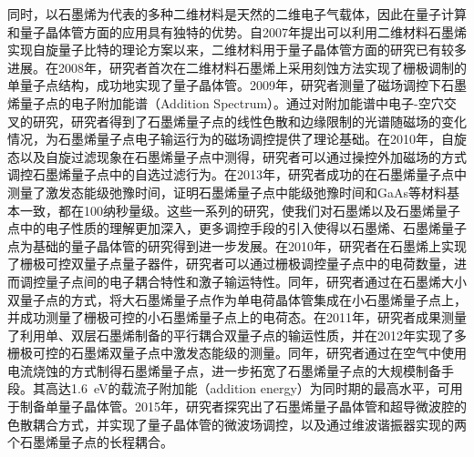     同时，以石墨烯为代表的多种二维材料是天然的二维电子气载体，因此在量子计算和量子晶体管方面的应用具有独特的优势。自2007年提出可以利用二维材料石墨烯实现自旋量子比特的理论方案以来，二维材料用于量子晶体管方面的研究已有较多进展。在2008年，研究者首次在二维材料石墨烯上采用刻蚀方法实现了栅极调制的单量子点结构，成功地实现了量子晶体管。2009年，研究者测量了磁场调控下石墨烯量子点的电子附加能谱（Addition Spectrum）。通过对附加能谱中电子-空穴交叉的研究，研究者得到了石墨烯量子点的线性色散和边缘限制的光谱随磁场的变化情况，为石墨烯量子点电子输运行为的磁场调控提供了理论基础。在2010年，自旋态以及自旋过滤现象在石墨烯量子点中测得，研究者可以通过操控外加磁场的方式调控石墨烯量子点中的自选过滤行为。在2013年，研究者成功的在石墨烯量子点中测量了激发态能级弛豫时间，证明石墨烯量子点中能级弛豫时间和GaAs等材料基本一致，都在100纳秒量级。这些一系列的研究，使我们对石墨烯以及石墨烯量子点中的电子性质的理解更加深入，更多调控手段的引入使得以石墨烯、石墨烯量子点为基础的量子晶体管的研究得到进一步发展。在2010年，研究者在石墨烯上实现了栅极可控双量子点量子器件，研究者可以通过栅极调控量子点中的电荷数量，进而调控量子点间的电子耦合特性和激子输运特性。同年，研究者通过在石墨烯大小双量子点的方式，将大石墨烯量子点作为单电荷晶体管集成在小石墨烯量子点上，并成功测量了栅极可控的小石墨烯量子点上的电荷态。在2011年，研究者成果测量了利用单、双层石墨烯制备的平行耦合双量子点的输运性质，并在2012年实现了多栅极可控的石墨烯双量子点中激发态能级的测量。同年，研究者通过在空气中使用电流烧蚀的方式制得石墨烯量子点，进一步拓宽了石墨烯量子点的大规模制备手段。其高达\SI{1.6}{\electronvolt}的载流子附加能（addition energy）为同时期的最高水平，可用于制备单量子晶体管。2015年，研究者探究出了石墨烯量子晶体管和超导微波腔的色散耦合方式，并实现了量子晶体管的微波场调控，以及通过维波谐振器实现的两个石墨烯量子点的长程耦合。

